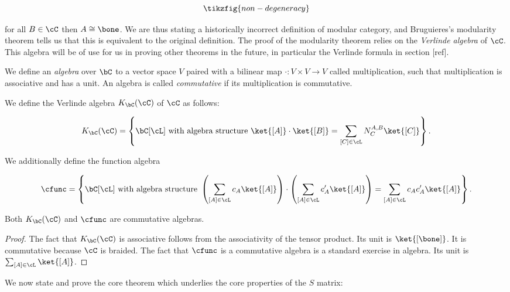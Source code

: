 \begin{equation*}
\tikzfig{non-degeneracy}
\end{equation*}

for all $B\in \cC$ then $A\cong \bone$. We are thus stating a historically incorrect definition of modular category, and Bruguieres's modularity theorem tells us that this is equivalent to the original definition. The proof of the modularity theorem relies on the \textit{Verlinde algebra} of $\cC$. This algebra will be of use for us in proving other theorems in the future, in particular the Verlinde formula in section [ref].

We define an \textit{algebra} over $\bC$ to a vector space $V$ paired with a bilinear map $\cdot: V\times V\to V$ called multiplication, such that multiplication is associative and has a unit. An algebra is called \textit{commutative} if its multiplication is commutative.

We define the Verlinde algebra $K_{\bC}(\cC)$ of $\cC$ as follows:

$$K_{\bC}(\cC)=
\left\{
\bC[\cL] \text{ with algebra structure }
\ket{[A]}\cdot \ket{[B]}=\sum_{[C]\in \cL}N^{A,B}_{C}\ket{[C]}
\right\}.$$

We additionally define the function algebra

$$
\cfunc=
\left\{
\bC[\cL] \text{ with algebra structure }
\left(\sum_{[A]\in \cL}c_A \ket{[A]}\right)\cdot \left(\sum_{[A]\in \cL}c_A' \ket{[A]}\right)= \sum_{[A]\in \cL}c_A c_A' \ket{[A]}
\right\}.
$$

\begin{lem} Both $K_{\bC}(\cC)$ and $\cfunc$ are commutative algebras.
\end{lem}
\begin{proof} The fact that $K_{\bC}(\cC)$ is associative follows from the associativity of the tensor product. Its unit is $\ket{[\bone]}$. It is commutative because $\cC$ is braided. The fact that $\cfunc$ is a commutative algebra is a standard exercise in algebra. Its unit is $\sum_{[A]\in \cL}\ket{[A]}$.
\end{proof}


We now state and prove the core theorem which underlies the core properties of the $S$ matrix:

